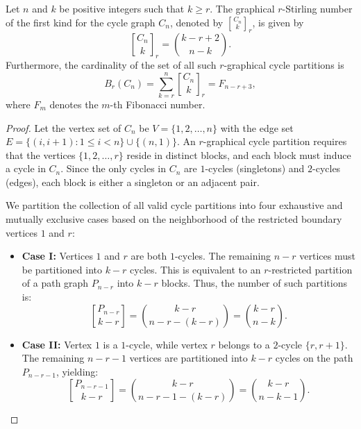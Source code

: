 \documentclass[10pt,a4paper]{amsart}
\begin{document}
\begin{theorem}\label{thm:cycle_stirling}
Let $n$ and $k$ be positive integers such that $k \geq r$. The graphical $r$-Stirling number of the first kind for the cycle graph $C_n$, denoted by ${C_n \brack k}_r$, is given by
\begin{equation*}
    {C_n \brack k}_r = \binom{k-r+2}{n-k}.
\end{equation*}
Furthermore, the cardinality of the set of all such $r$-graphical cycle partitions is 
\begin{equation*}
   B_r(C_n)=\sum_{k=r}^n {C_n \brack k}_r = F_{n-r+3},
\end{equation*}
where $F_m$ denotes the $m$-th Fibonacci number.
\end{theorem}

\begin{proof}
Let the vertex set of $C_n$ be $V = \{1, 2, \dots, n\}$ with the edge set $E = \{(i, i+1) : 1 \le i < n\} \cup \{(n, 1)\}$. An $r$-graphical cycle partition requires that the vertices $\{1, 2, \dots, r\}$ reside in distinct blocks, and each block must induce a cycle in $C_n$. Since the only cycles in $C_n$ are $1$-cycles (singletons) and $2$-cycles (edges), each block is either a singleton or an adjacent pair. 

We partition the collection of all valid cycle partitions into four exhaustive and mutually exclusive cases based on the neighborhood of the restricted boundary vertices $1$ and $r$:

\begin{itemize}
    \item \textbf{Case I:} Vertices $1$ and $r$ are both $1$-cycles. 
    The remaining $n-r$ vertices must be partitioned into $k-r$ cycles. This is equivalent to an $r$-restricted partition of a path graph $P_{n-r}$ into $k-r$ blocks. Thus, the number of such partitions is:
    \begin{equation*}
        {P_{n-r} \brack k-r} = \binom{k-r}{n-r-(k-r)} = \binom{k-r}{n-k}.
    \end{equation*}

    \item \textbf{Case II:} Vertex $1$ is a $1$-cycle, while vertex $r$ belongs to a $2$-cycle $\{r, r+1\}$. 
    The remaining $n-r-1$ vertices are partitioned into $k-r$ cycles on the path $P_{n-r-1}$, yielding:
    \begin{equation*}
        {P_{n-r-1} \brack k-r} = \binom{k-r}{n-r-1-(k-r)} = \binom{k-r}{n-k-1}.
    \end{equation*}


\end{itemize}
\end{proof}
\end{document}
